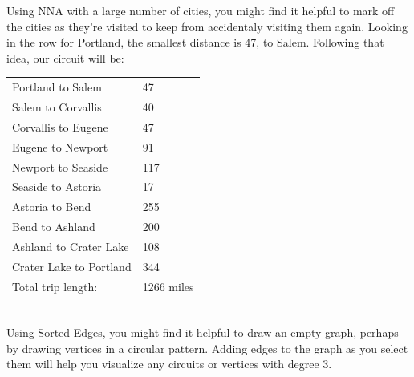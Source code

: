 \begin{example}{}{}
\noindent Using NNA with a large number of cities, you might find it helpful to mark off the cities as they're visited to keep from accidentaly visiting them again.  Looking in the row for Portland, the smallest distance is 47, to Salem.  Following that idea, our circuit will be:\\
\begin{minipage}{0.5\textwidth}
\begin{tabular}{ll}
Portland to Salem&		47\\
Salem to Corvallis&		40\\
Corvallis to Eugene&		47\\
Eugene to Newport	&	91\\
Newport to Seaside	&	117\\
Seaside to Astoria	&	17\\
Astoria to Bend		&255\\
Bend to Ashland	&	200\\
Ashland to Crater Lake&	108\\
Crater Lake to Portland&	344\\
Total trip length:		&1266 miles\\
\end{tabular}\\


Using Sorted Edges, you might find it helpful to draw an empty graph, perhaps by drawing vertices in a circular pattern.  Adding edges to the graph as you select them will help you visualize any circuits or vertices with degree 3.\\
\end{minipage}
%
\begin{minipage}{0.5\textwidth}
\vspace{0.5in}
\end{minipage}


\end{example}
